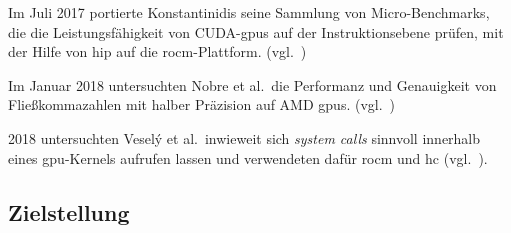 Im Juli 2017 portierte Konstantinidis seine Sammlung von Micro-Benchmarks, die
die Leistungsfähigkeit von CUDA-\gls{gpu}s auf der Instruktionsebene prüfen,
mit der Hilfe von \gls{hip} auf die \gls{rocm}-Plattform.
(vgl.~\cite{konstantinidis2017})

Im Januar 2018 untersuchten Nobre et al.\ die Performanz und Genauigkeit von
Fließkommazahlen mit halber Präzision auf AMD \gls{gpu}s.
(vgl.~\cite{nobre2018})

2018 untersuchten Veselý et al.\, inwieweit sich \textit{system calls} sinnvoll
innerhalb eines \gls{gpu}-Kernels aufrufen lassen und verwendeten dafür
\gls{rocm} und \gls{hc} (vgl.~\cite{vesely2018}).

\subsection{Zielstellung}
\label{einleitung:zielstellung}

